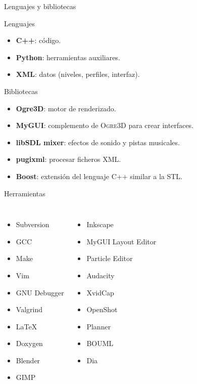\documentclass[green]{beamer}
\begin{document}
\begin{frame}{Lenguajes y bibliotecas}
    \begin{block}{Lenguajes}
	\begin{itemize}
	    \item \textbf{C++}: código.
	    \item \textbf{Python}: herramientas auxiliares.
	    \item \textbf{XML}: datos (niveles, perfiles, interfaz).
	\end{itemize}
    \end{block}
    
    \begin{block}{Bibliotecas}
	\begin{itemize}
	    \item \textbf{Ogre3D}: motor de renderizado. 
	    \item \textbf{MyGUI}: complemento de \textsc{Ogre3D} para crear
	    interfaces.
	    \item \textbf{libSDL mixer}: efectos de sonido y pistas musicales.
	    \item \textbf{pugixml}: procesar ficheros XML.
	    \item \textbf{Boost}: extensión del lenguaje C++ similar a la \textsc{STL}.
	\end{itemize}
    \end{block}
\end{frame}

\begin{frame}{Herramientas}
    \begin{columns}[t]
	
	\column{150pt}
    
	\begin{itemize}
	    \item Subversion
	    \item GCC
	    \item Make
	    \item Vim
	    \item GNU Debugger
	    \item Valgrind
	    \item \LaTeX
	    \item Doxygen
	    \item Blender
	    \item GIMP
	\end{itemize}
	
	\column{150pt}
	
	\begin{itemize}
	    \item Inkscape
	    \item MyGUI Layout Editor
	    \item Particle Editor
	    \item Audacity
	    \item XvidCap
	    \item OpenShot
	    \item Planner
	    \item BOUML
	    \item Dia
	\end{itemize}
    \end{columns}
\end{frame}
\end{document}
